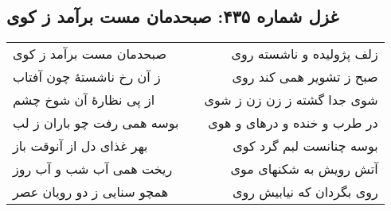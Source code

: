 \begin{center}
\section*{غزل شماره ۴۳۵: صبحدمان مست برآمد ز کوی}
\label{sec:435}
\begin{longtable}{l p{0.5cm} r}
صبحدمان مست برآمد ز کوی
&&
زلف پژولیده و ناشسته روی
\\
ز آن رخ ناشستهٔ چون آفتاب
&&
صبح ز تشویر همی کند روی
\\
از پی نظارهٔ آن شوخ چشم
&&
شوی جدا گشته ز زن زن ز شوی
\\
بوسه همی رفت چو باران ز لب
&&
در طرب و خنده و درهای و هوی
\\
بهر غذای دل از آنوقت باز
&&
بوسه چنانست لبم گرد کوی
\\
ریخت همی آب شب و آب روز
&&
آتش رویش به شکنهای موی
\\
همچو سنایی ز دو رویان عصر
&&
روی بگردان که نیابیش روی
\\
\end{longtable}
\end{center}
